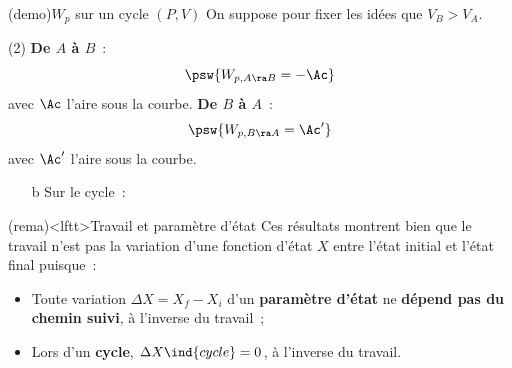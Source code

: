 \documentclass[../../main/main.tex]{subfiles}
\begin{document}
\begin{tcb*}[breakable](demo){$W_p$ sur un cycle $(P,V)$}
	On suppose pour fixer les idées que $V_B > V_A$.
	\begin{tasks}[label=\bdmd](2)
		\task \textbf{De $A$ à $B$}~:
		\[
			\psw{W_{p,A\ra B} = -\Ac}
		\]
		avec $\Ac$ l'aire sous la courbe.
		\task \textbf{De $B$ à $A$}~:
		\[
			\psw{W_{p,B\ra A} = \Ac'}
		\]
		avec $\Ac'$ l'aire sous la courbe.
	\end{tasks}
	\begin{itemize}
		\item[b]{Sur le cycle}~:
	\end{itemize}
	\vspace*{-15pt}
	\begin{center}
	\end{center}
\end{tcb*}

\begin{tcb}(rema)<lftt>{Travail et paramètre d'état}
	Ces résultats montrent bien que le travail n'est pas la variation d'une
	fonction d'état $X$ entre l'état initial et l'état final puisque~:
	\begin{itemize}
		\item Toute variation $\Delta{X} = X_f - X_i$ d'un \textbf{paramètre d'état}
		      ne \textbf{dépend pas du chemin suivi}, à l'inverse du travail~;
		\item Lors d'un \textbf{cycle}, $\Delta{X}\ind{cycle} = 0$, à l'inverse du
		      travail.
	\end{itemize}
\end{tcb}
\end{document}
